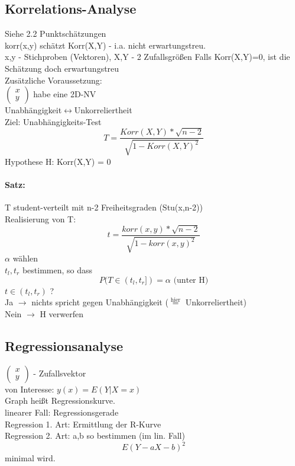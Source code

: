 \documentclass[a4paper,12pt]{scrartcl}
\begin{document}
  \subsection{Korrelations-Analyse}
  Siehe 2.2 Punktschätzungen\\
  korr(x,y) schätzt Korr(X,Y) - i.a. nicht erwartungstreu.\\
  x,y - Stichproben (Vektoren),\hspace{2cm} X,Y - 2 Zufallsgrößen
  Falls Korr(X,Y)=0, ist die Schätzung doch erwartungstreu\\
  Zusätzliche Voraussetzung:\\
  $\begin{pmatrix}x\\y\end{pmatrix}$ habe eine 2D-NV\\
  Unabhängigkeit$\leftrightarrow$Unkorreliertheit\\
  Ziel: Unabhängigkeits-Test
  $$T=\frac{Korr(X,Y)*\sqrt{n-2}}{\sqrt{1-Korr(X,Y)^2}} $$
  Hypothese H: Korr(X,Y) = 0\\
  \paragraph{Satz:} T student-verteilt mit n-2 Freiheitsgraden (Stu(x,n-2))\\
  Realisierung von T:
  $$t = \frac{korr(x,y)*\sqrt{n-2}}{\sqrt{1-korr(x,y)^2}}$$
  $\alpha$ wählen\\
  $t_l, t_r$ bestimmen, so dass
  $$P(T\in(t_l,t_r])=\alpha \text{ (unter H)}$$
  $t\in(t_l,t_r)$ ?\\
  Ja $\to$ nichts spricht gegen Unabhängigkeit ($\overset{\text{hier}}{=}$ Unkorreliertheit)\\
  Nein $\to$ H verwerfen
  
  \subsection{Regressionsanalyse}
  $\begin{pmatrix}x\\y\end{pmatrix}$ - Zufallsvektor\\
  von Interesse: $y(x) = E(Y|X=x)$\\
  Graph heißt Regressionskurve.\\
  linearer Fall: Regressionsgerade\\
  Regression 1. Art: Ermittlung der R-Kurve\\
  Regression 2. Art: a,b so bestimmen (im lin. Fall)
  $$E(Y-aX-b)^2$$
  minimal wird.
  
\end{document}
